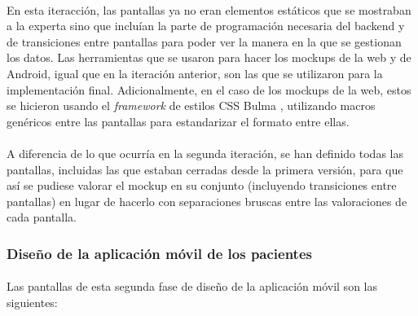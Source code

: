 \paragraph{}
En esta iteracción, las pantallas ya no eran elementos estáticos que se mostraban a la experta sino que incluían la parte de programación necesaria del backend y de transiciones entre pantallas para poder ver la manera en la que se gestionan los datos. Las herramientas que se usaron para hacer los mockups de la web y de Android, igual que en la iteración anterior, son las que se utilizaron para la implementación final. Adicionalmente, en el caso de los mockups de la web, estos se hicieron usando el \textit{framework} de estilos CSS Bulma \citep{responsivelearning}, utilizando macros genéricos entre las pantallas para estandarizar el formato entre ellas.

\paragraph{}
A diferencia de lo que ocurría en la segunda iteración, se han definido todas las pantallas, incluidas las que estaban cerradas desde la primera versión, para que así se pudiese valorar el mockup en su conjunto (incluyendo transiciones entre pantallas) en lugar de hacerlo con separaciones bruscas entre las valoraciones de cada pantalla.

\subsubsection{Diseño de la aplicación móvil de los pacientes}
\paragraph{}
\paragraph{}
Las pantallas de esta segunda fase de diseño de la aplicación móvil son las siguientes:


